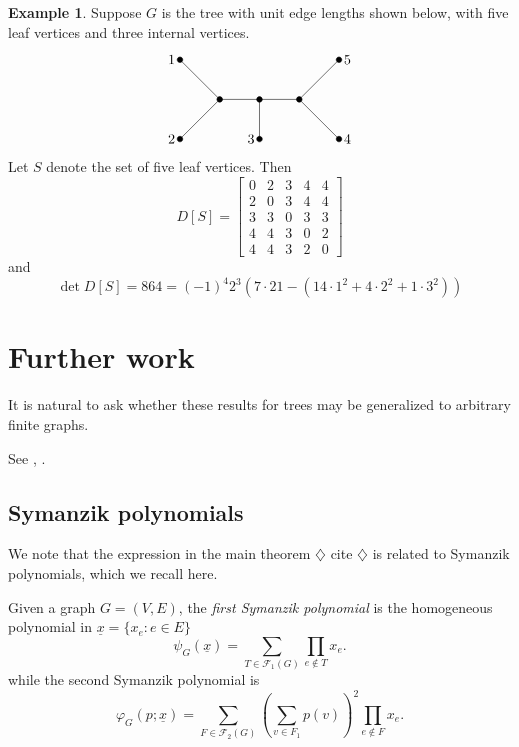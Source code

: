 \documentclass{amsart}
\theoremstyle{definition}
\newtheorem{eg}[thm]{Example}
\newcommand{\trees}{\mathcal{F}_1}
\newcommand{\forests}{\mathcal{F}}
\newcommand{\note}[1]{{\color{red} \sf $\diamondsuit$  {#1} $\diamondsuit$ }}
\newcommand{\todo}[1]{\note{#1}}
\begin{document}
\begin{eg}
Suppose $G$ is the tree with unit edge lengths shown below, with five leaf vertices and three internal vertices.
\[
\begin{tikzpicture}
	\filldraw[black] (-2,1) coordinate (1) circle (2pt);
	\filldraw[black] (-2,-1) coordinate (2) circle (2pt);
	\filldraw[black] (0,-1) coordinate (3) circle (2pt);
	\filldraw[black] (2,-1) coordinate (4) circle (2pt);
	\filldraw[black] (2,1) coordinate (5) circle (2pt);
	\filldraw[black] (-1,0) coordinate (A) circle (2pt);
	\filldraw[black] (0,0) coordinate (B) circle (2pt);
	\filldraw[black] (1,0) coordinate (C) circle (2pt);

	\node[left] at (1) {$1$};
	\node[left] at (2) {$2$};
	\node[left] at (3) {$3$};
	\node[right] at (4) {$4$};
	\node[right] at (5) {$5$};

	\draw (B) -- (A) -- (1);
	\draw (A) -- (2);
	\draw (3) -- (B) -- (C) -- (4);
	\draw (C) -- (5);
\end{tikzpicture}
\]
Let $S$ denote the set of five leaf vertices. Then
$$
D[S] = \begin{bmatrix}
0 & 2 & 3 & 4 & 4 \\
2 & 0 & 3 & 4 & 4 \\
3 & 3 & 0 & 3 & 3 \\
4 & 4 & 3 & 0 & 2 \\
4 & 4 & 3 & 2 & 0
\end{bmatrix}
$$
and
$$
\det D[S] = 864
= (-1)^4 2^3 \left( 7 \cdot 21 - (14 \cdot 1^2 + 4 \cdot 2^2 + 1 \cdot 3^2) \right)
$$
\end{eg}

\section{Further work}

It is natural to ask whether these results for trees may be generalized to arbitrary finite graphs.


See \cite{richman-shokrieh-wu}, \cite{richman-shokrieh-wu-2}.

\subsection{Symanzik polynomials}

We note that the expression in the main theorem \todo{cite} is related to Symanzik polynomials, which we recall here.

Given a graph $G = (V, E)$, the {\em first Symanzik polynomial} is the homogeneous polynomial in $\underline{x} = \{x_e : e \in E\}$
\[
	\psi_G(\underline{x}) = \sum_{T \in \trees(G)} \prod_{e \not \in T} x_e .
\]
while the second Symanzik polynomial is
\[
	\varphi_G(p; \underline{x}) = \sum_{F \in \forests_2(G)} \left(\sum_{v \in F_1} p(v) \right)^2 \prod_{e \not\in F} x_e .
\]
\end{document}
